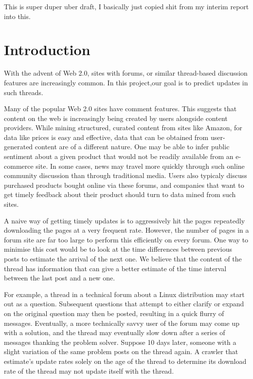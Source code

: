 \documentclass[]{homework}
\begin{document}

This is super duper uber draft, I basically just copied shit from my interim report into this.
\section{Introduction}
With the advent of Web 2.0, sites with forums, or similar thread-based discussion features are increasingly common.
In this project,our goal is to predict updates in such threads.

Many of the popular Web 2.0 sites have comment features. This suggests that content on the web is increasingly being created by users alongside content providers. While mining structured, curated content from sites like Amazon, for data like prices is easy and effective, data that can be obtained from user-generated content are of a different nature. One may be able to infer public sentiment about a given product that would not be readily available from an e-commerce site.
In some cases, news may travel more quickly through such online community discussion than through traditional media. Users also typicaly discuss purchased products bought online via these forums, and companies that want to get timely feedback about their product should turn to data mined from such sites.

A naive way of getting timely updates is to aggressively hit the pages repeatedly downloading the pages at a very frequent rate. However, the number of pages in a forum site are far too large to perform this efficiently on every forum. One way to minimise this cost would be to look at the time differences between previous posts to estimate the arrival of the next one. We believe that the content of the thread has information that can give a better estimate of the time interval between the last post and a new one.


For example, a thread in a technical forum about a Linux distribution may start out as a question. Subsequent questions that attempt to either clarify or expand on the original question may then be posted, resulting in a quick flurry of messages. Eventually, a more technically savvy user of the forum may come up with a solution, and the thread may eventually slow down after a series of messages thanking the problem solver. Suppose 10 days later, someone with a slight variation of the same problem posts on the thread again. A crawler that estimate's update rates solely on the age of the thread to determine its download rate of the thread may not update itself with the thread.
\end{document}
